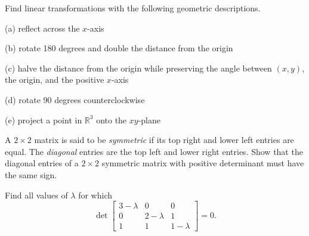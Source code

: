 \documentclass{watsonbook}
\begin{document}
\newpage 


\begin{aexercise}
Find linear transformations with the following geometric
descriptions. 

(a) reflect across the $x$-axis

(b) rotate 180 degrees and double the distance from the origin

(c) halve the distance from the origin while preserving the angle
between $(x,y)$, the origin, and the positive $x$-axis

(d) rotate 90 degrees counterclockwise

(e) project a point in $\mathbb{R}^3$ onto the $xy$-plane
\end{aexercise}


\begin{aexercise}
  A $2\times 2$ matrix is said to be \textit{symmetric} if its top
  right and lower left entries are equal. The \textit{diagonal}
  entries are the top left and lower right entries. Show that the
  diagonal entries of a $2\times 2$
  symmetric matrix with positive determinant must have the same sign. 
\end{aexercise}

\begin{aexercise}
  Find all values of $\lambda$ for which 
\[
\det \left[
\begin{array}{ccc}
3 - \lambda & 0 & 0 \\
0 & 2-\lambda & 1 \\
1 & 1 & 1 - \lambda
\end{array}
\right]
= 0. 
\]
\end{aexercise}

\newpage 

\end{document}
